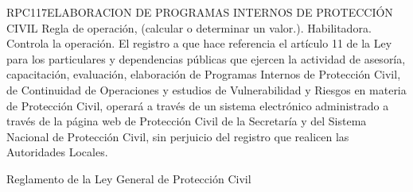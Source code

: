 \begin{BusinessRule}{RPC117}{ELABORACION DE PROGRAMAS INTERNOS DE PROTECCIÓN CIVIL}{
		Regla de operación, (calcular o determinar un valor.).
	}{
		Habilitadora. 
	}{
		Controla la operación. %
	}
	\BRItem[Descripción:] El registro a que hace referencia el artículo 11 de la Ley para los particulares y dependencias públicas que ejercen la actividad de asesoría, capacitación, evaluación, elaboración de Programas Internos de Protección Civil, de Continuidad de Operaciones y estudios de Vulnerabilidad y Riesgos en materia de Protección Civil, operará a través de un sistema electrónico administrado a través de la página web de Protección Civil de la Secretaría y del Sistema Nacional de Protección Civil, sin perjuicio del registro que realicen las Autoridades Locales.
	
	
	 Reglamento de la Ley General de Protección Civil
\end{BusinessRule}